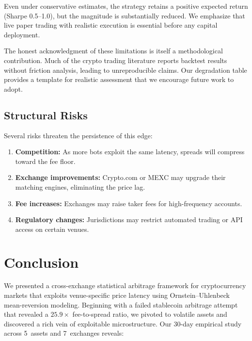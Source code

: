 \documentclass[sigconf,nonacm=false]{acmart}
\begin{document}
Even under conservative estimates, the strategy retains a positive expected return (Sharpe 0.5--1.0), but the magnitude is substantially reduced. We emphasize that live paper trading with realistic execution is essential before any capital deployment.

The honest acknowledgment of these limitations is itself a methodological contribution. Much of the crypto trading literature reports backtest results without friction analysis, leading to unreproducible claims. Our degradation table provides a template for realistic assessment that we encourage future work to adopt.

\subsection{Structural Risks}

Several risks threaten the persistence of this edge:
\begin{enumerate}
    \item \textbf{Competition:} As more bots exploit the same latency, spreads will compress toward the fee floor.
    \item \textbf{Exchange improvements:} Crypto.com or MEXC may upgrade their matching engines, eliminating the price lag.
    \item \textbf{Fee increases:} Exchanges may raise taker fees for high-frequency accounts.
    \item \textbf{Regulatory changes:} Jurisdictions may restrict automated trading or API access on certain venues.
\end{enumerate}

\section{Conclusion}\label{sec:conclusion}

We presented a cross-exchange statistical arbitrage framework for cryptocurrency markets that exploits venue-specific price latency using Ornstein--Uhlenbeck mean-reversion modeling. Beginning with a failed stablecoin arbitrage attempt that revealed a $25.9\times$ fee-to-spread ratio, we pivoted to volatile assets and discovered a rich vein of exploitable microstructure. Our 30-day empirical study across 5~assets and 7~exchanges reveals:
\end{document}
